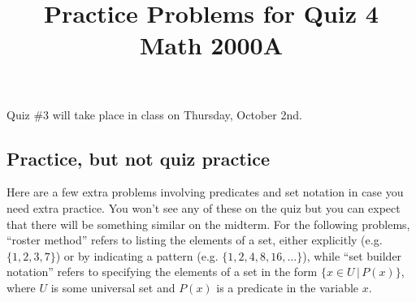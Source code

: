 \documentclass[letterpaper,12pt]{article}
\title{Practice Problems for Quiz 4\\Math 2000A}
\date{}
\begin{document}
 \maketitle
\vspace{-0.5in}

Quiz \#3 will take place in class on Thursday, October 2nd. 

\subsection*{Practice, but not quiz practice}
Here are a few extra problems involving predicates and set notation in case you need extra practice. You won't see any of these on the quiz but you can expect that there will be something similar on the midterm. For the following problems, ``roster method'' refers to listing the elements of a set, either explicitly (e.g. $\{1,2,3,7\}$) or by indicating a pattern (e.g. $\{1,2,4,8,16,\ldots\}$), while ``set builder notation'' refers to specifying the elements of a set in the form $\{x\in U\,|\, P(x)\}$, where $U$ is some universal set and $P(x)$ is a predicate in the variable $x$.
\end{document}
